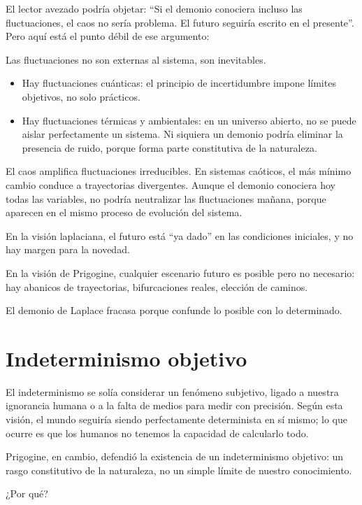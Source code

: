\documentclass[
  10pt,
  a4paper,
  DIV=11,
  numbers=noendperiod,
  open=any]{scrreprt}
\numberwithin{equation}{chapter}
\numberwithin{equation}{section}
\renewcommand{\[}{\begin{equation}}
\renewcommand{\]}{\end{equation}}
\begin{document}
El lector avezado podría objetar: ``Si el demonio conociera incluso las
fluctuaciones, el caos no sería problema. El futuro seguiría escrito en
el presente''. Pero aquí está el punto débil de ese argumento:

Las fluctuaciones no son externas al sistema, son inevitables.

\begin{itemize}
\item
  Hay fluctuaciones cuánticas: el principio de incertidumbre impone
  límites objetivos, no solo prácticos.
\item
  Hay fluctuaciones térmicas y ambientales: en un universo abierto, no
  se puede aislar perfectamente un sistema. Ni siquiera un demonio
  podría eliminar la presencia de ruido, porque forma parte constitutiva
  de la naturaleza.
\end{itemize}

El caos amplifica fluctuaciones irreducibles. En sistemas caóticos, el
más mínimo cambio conduce a trayectorias divergentes. Aunque el demonio
conociera hoy todas las variables, no podría neutralizar las
fluctuaciones mañana, porque aparecen en el mismo proceso de evolución
del sistema.

En la visión laplaciana, el futuro está ``ya dado'' en las condiciones
iniciales, y no hay margen para la novedad.

En la visión de Prigogine, cualquier escenario futuro es posible pero no
necesario: hay abanicos de trayectorias, bifurcaciones reales, elección
de caminos.

El demonio de Laplace fracasa porque confunde lo posible con lo
determinado.

\section{Indeterminismo objetivo}\label{indeterminismo-objetivo}

El indeterminismo se solía considerar un fenómeno subjetivo, ligado a
nuestra ignorancia humana o a la falta de medios para medir con
precisión. Según esta visión, el mundo seguiría siendo perfectamente
determinista en sí mismo; lo que ocurre es que los humanos no tenemos la
capacidad de calcularlo todo.

Prigogine, en cambio, defendió la existencia de un indeterminismo
objetivo: un rasgo constitutivo de la naturaleza, no un simple límite de
nuestro conocimiento.

¿Por qué?
\end{document}
